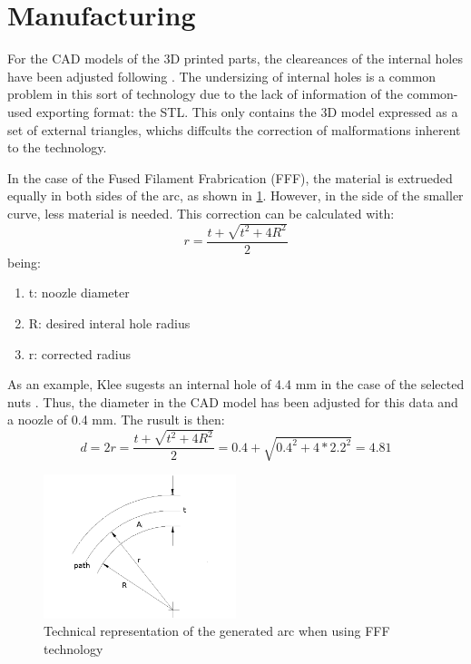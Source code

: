 \section{Manufacturing} %
\label{sec:manufacturing}

For the CAD models of the 3D printed parts, the cleareances of the internal holes have been adjusted following \cite{arc_compensation}.
The undersizing of internal holes is a common problem in this sort of technology due to the lack of information of the common-used exporting format: the STL.
This only contains the 3D model expressed as a set of external triangles, whichs diffcults the correction of malformations inherent to the technology.

In the case of the Fused Filament Frabrication (FFF), the material is extrueded equally in both sides of the arc, as shown in \ref{fig:arc_compensation}. 
However, in the side of the smaller curve, less material is needed.
This correction can be calculated with:
$$ r=\frac{t+\sqrt{t^2+4R^2}}{2}$$
being:
\begin{enumerate}
	\item t: noozle diameter
	\item R: desired interal hole radius
	\item r: corrected radius
\end{enumerate}
As an example, Klee sugests an internal hole of 4.4 mm in the case of the selected nuts \cite{klee}. Thus, the diameter in the CAD model has been adjusted for this data and a noozle of 0.4 mm. The rusult is then:
$$ d=2r=\frac{t+\sqrt{t^2+4R^2}}{2}=0.4+\sqrt{0.4^2+4*2.2^2}=4.81$$

\begin{figure}[tb]
	\centering
	\includegraphics[width=0.5\textwidth]{figures/Arc-compensation}
	\caption{Technical representation of the generated arc when using FFF technology}
	\label{fig:arc_compensation}
\end{figure}

